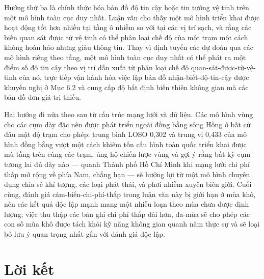 Hướng thứ ba là chính thức hóa bản đồ độ tin cậy hoặc tin tưởng vệ tinh trên một mô hình toàn cục duy nhất. Luận văn cho thấy một mô hình triển khai được hoạt động tốt hơn nhiều tại tầng ô nhiễm so với tại các vị trí sạch, và rằng các biến quan sát được từ vệ tinh có thể phân loại chế độ của một trạm một cách không hoàn hảo nhưng giàu thông tin. Thay vì định tuyến các dự đoán qua các mô hình riêng theo tầng, một mô hình toàn cục duy nhất có thể phát ra một điểm số độ tin cậy theo vị trí dẫn xuất từ phân loại chế độ quan-sát-được-từ-vệ-tinh của nó, trực tiếp vận hành hóa việc lập bản đồ nhận-biết-độ-tin-cậy được khuyến nghị ở Mục 6.2 và cung cấp độ bất định biến thiên không gian mà các bản đồ đơn-giá-trị thiếu.

Hai hướng đi nữa theo sau từ cấu trúc mạng lưới và dữ liệu. Các mô hình vùng cho các cụm dày đặc nên được phát triển ngoài đồng bằng sông Hồng ở bất cứ đâu mật độ trạm cho phép: trung bình LOSO 0,302 và trung vị 0,433 của mô hình đồng bằng vượt một cách khiêm tốn cấu hình toàn quốc triển khai được mù-tầng trên cùng các trạm, ủng hộ chiến lược vùng và gợi ý rằng bất kỳ cụm tương lai đủ dày nào --- quanh Thành phố Hồ Chí Minh khi mạng lưới chi phí thấp mở rộng về phía Nam, chẳng hạn --- sẽ hưởng lợi từ một mô hình chuyên dụng chia sẻ khí tượng, các loại phát thải, và phơi nhiễm xuyên biên giới. Cuối cùng, đánh giá cảm-biến-chi-phí-thấp trong luận văn này bị giới hạn ở mùa khô, nên các kết quả độc lập mạnh mang một nhiễu loạn theo mùa chưa được định lượng; việc thu thập các bản ghi chi phí thấp dài hơn, đa-mùa sẽ cho phép các con số mùa khô được tách khỏi kỹ năng không gian quanh năm thực sự và sẽ loại bỏ lưu ý quan trọng nhất gắn với đánh giá độc lập.

\section{Lời kết}

